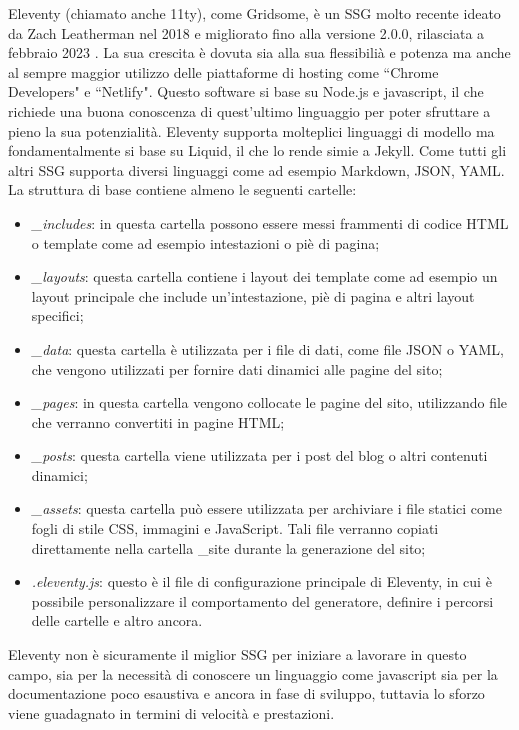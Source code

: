 \documentclass[target=bach,aauheader=]{thud}
\begin{document}
Eleventy (chiamato anche 11ty), come Gridsome, è un SSG molto recente ideato da Zach Leatherman nel 2018 e migliorato fino alla versione 2.0.0, rilasciata a febbraio 2023 \cite{eleventy-site}. 
La sua crescita è dovuta sia alla sua flessibilià e potenza ma anche al sempre maggior utilizzo delle piattaforme di hosting come ``Chrome Developers" e ``Netlify". \newline
Questo software si base su Node.js e javascript, il che richiede una buona conoscenza di quest'ultimo linguaggio per poter sfruttare a pieno la sua potenzialità. Eleventy supporta molteplici linguaggi di modello ma fondamentalmente si base su Liquid, il che lo rende simie a Jekyll.
Come tutti gli altri SSG supporta diversi linguaggi come ad esempio Markdown, JSON, YAML. \newline 
La struttura di base contiene almeno le seguenti cartelle:

\begin{itemize}
    \item \textit{\_includes}: in questa cartella possono essere messi frammenti di codice HTML o template come ad esempio intestazioni o piè di pagina;
    \item \textit{\_layouts}: questa cartella contiene i layout dei template come ad esempio un layout principale che include un'intestazione, piè di pagina e altri layout specifici;
    \item \textit{\_data}: questa cartella è utilizzata per i file di dati, come file JSON o YAML, che vengono utilizzati per fornire dati dinamici alle pagine del sito;
    \item \textit{\_pages}: in questa cartella vengono collocate le pagine del sito, utilizzando file che verranno convertiti in pagine HTML;
    \item \textit{\_posts}: questa cartella viene utilizzata per i post del blog o altri contenuti dinamici;
    \item \textit{\_assets}: questa cartella può essere utilizzata per archiviare i file statici come fogli di stile CSS, immagini e JavaScript. Tali file verranno copiati direttamente nella cartella \_site durante la generazione del sito;
    \item \textit{.eleventy.js}: questo è il file di configurazione principale di Eleventy, in cui è possibile personalizzare il comportamento del generatore, definire i percorsi delle cartelle e altro ancora.
\end{itemize}

Eleventy non è sicuramente il miglior SSG per iniziare a lavorare in questo campo, sia per la necessità di conoscere un linguaggio come javascript sia per la documentazione poco esaustiva e ancora in fase di sviluppo, tuttavia lo sforzo viene guadagnato in termini di velocità e prestazioni.   
\end{document}

